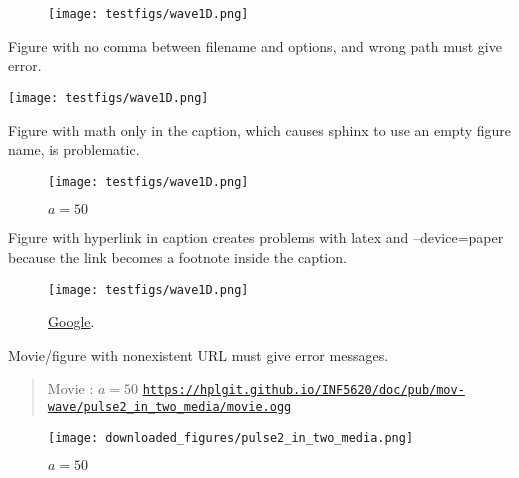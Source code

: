 \documentclass[%
oneside,                 %
final,                   %
10pt]{article}
\newenvironment{doconce:movie}{}{}
\newcounter{doconce:movie:counter}
\begin{document}
\begin{figure}[!ht]  %
  \centerline{\texttt{[image: testfigs/wave1D.png]}}
  \caption{
  \label{myl1}
  }
\end{figure}

Figure with no comma between filename and options, and wrong path must
give error.

\vspace{6mm}

\centerline{\texttt{[image: testfigs/wave1D.png]}}

\vspace{6mm}

Figure with math only in the caption, which causes sphinx to use an
empty figure name, is problematic.

\begin{figure}[!ht]  %
  \centerline{\texttt{[image: testfigs/wave1D.png]}}
  \caption{
  $a=50$
  }
\end{figure}

Figure with hyperlink in caption creates problems with latex and --device=paper
because the link becomes a footnote inside the caption.

\begin{figure}[!ht]  %
  \centerline{\texttt{[image: testfigs/wave1D.png]}}
  \caption{
  \href{{https://google.com}}{Google}.
  }
\end{figure}

Movie/figure with nonexistent URL must give error messages.


\begin{doconce:movie}
\begin{quote}
Movie : $a=50$ \href{https://hplgit.github.io/INF5620/doc/pub/mov-wave/pulse2_in_two_media/movie.ogg}{\nolinkurl{https://hplgit.github.io/INF5620/doc/pub/mov-wave/pulse2_in_two_media/movie.ogg}}
\end{quote}
\end{doconce:movie}


\begin{figure}[!ht]  %
  \centerline{\texttt{[image: downloaded\_figures/pulse2\_in\_two\_media.png]}}
  \caption{
  $a=50$
  }
\end{figure}
\end{document}
